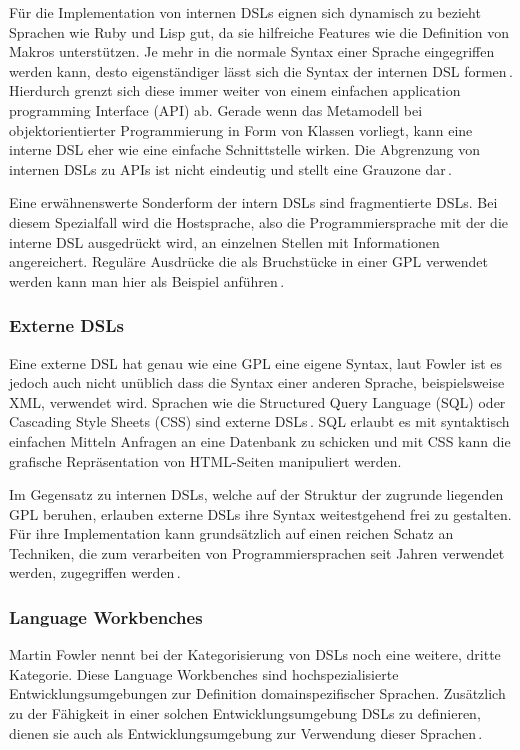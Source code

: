\documentclass[12pt,oneside,a4paper,parskip]{scrbook}
\begin{document}
Für die Implementation von internen DSLs eignen sich dynamisch zu bezieht Sprachen wie Ruby und Lisp gut, da sie hilfreiche Features wie die Definition von Makros unterstützen. Je mehr in die normale Syntax einer Sprache eingegriffen werden kann, desto eigenständiger lässt sich die Syntax der internen DSL formen\,\cite[S. 98]{stahl2007}. Hierdurch grenzt sich diese immer weiter von einem einfachen application programming Interface (API) ab. Gerade wenn das Metamodell bei objektorientierter Programmierung in Form von Klassen vorliegt, kann eine interne DSL eher wie eine einfache Schnittstelle wirken. Die Abgrenzung von internen DSLs zu APIs ist nicht eindeutig und stellt eine Grauzone dar\,\cite[S. 67]{fowler2010}.

Eine erwähnenswerte Sonderform der intern DSLs sind fragmentierte DSLs. Bei diesem Spezialfall wird die Hostsprache, also die Programmiersprache mit der die interne DSL ausgedrückt wird, an einzelnen Stellen mit Informationen angereichert. Reguläre Ausdrücke die als Bruchstücke in einer GPL verwendet werden kann man hier als Beispiel anführen\,\cite[S. 32]{fowler2010}.

\subsubsection{Externe DSLs}

Eine externe DSL hat genau wie eine GPL eine eigene Syntax, laut Fowler ist es jedoch auch nicht unüblich dass die Syntax einer anderen Sprache, beispielsweise XML,  verwendet wird. Sprachen wie die Structured Query Language (SQL) oder Cascading Style Sheets (CSS) sind externe DSLs\,\cite[S. 28]{fowler2010}. SQL erlaubt es mit syntaktisch einfachen Mitteln Anfragen an eine Datenbank zu schicken und mit CSS kann die grafische Repräsentation von HTML-Seiten manipuliert werden.

Im Gegensatz zu internen DSLs, welche auf der Struktur der zugrunde liegenden GPL beruhen, erlauben externe DSLs ihre Syntax weitestgehend frei zu gestalten. Für ihre Implementation kann grundsätzlich auf einen reichen Schatz an Techniken, die zum verarbeiten von Programmiersprachen seit Jahren verwendet werden, zugegriffen werden\,\cite[S. 89]{fowler2010}.

\subsubsection{Language Workbenches}

Martin Fowler nennt bei der Kategorisierung von DSLs noch eine weitere, dritte Kategorie. Diese Language Workbenches sind hochspezialisierte Entwicklungsumgebungen zur Definition domainspezifischer Sprachen. Zusätzlich zu der Fähigkeit in einer solchen Entwicklungsumgebung DSLs zu definieren, dienen sie auch als Entwicklungsumgebung zur Verwendung dieser Sprachen\,\cite[S.28]{fowler2010}.
\end{document}
